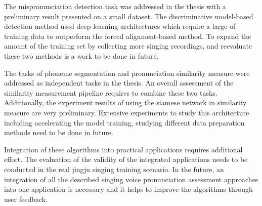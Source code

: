 The mispronunciation detection task was addressed in the thesis with a preliminary result presented on a small dataset. The discriminative model-based detection method used deep learning architectures which require a large of training data to outperform the forced alignment-based method. To expand the amount of the training set by collecting more singing recordings, and reevaluate these two methods is a work to be done in future. 

The tasks of phoneme segmentation and pronunciation similarity measure were addressed as independent tasks in the thesis. An overall assessment of the similarity measurement pipeline requires to combine these two tasks. Additionally, the experiment results of using the siamese network in similarity measure are very preliminary. Extensive experiments to study this architecture including accelerating the model training, studying different data preparation methods need to be done in future.

Integration of these algorithms into practical applications requires additional effort. The evaluation of the validity of the integrated applications needs to be conducted in the real jingju singing training scenario. In the future, an integration of all the described singing voice pronunciation assessment approaches into one application is necessary and it helps to improve the algorithms through user feedback. 
